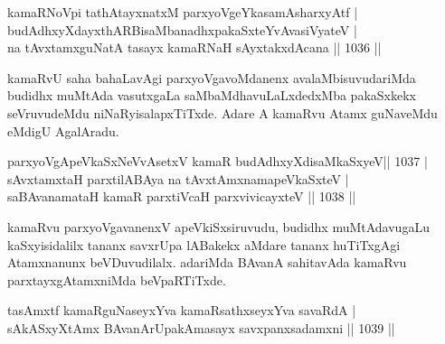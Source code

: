 
\begin{shl}
\footnotemark[3]kamaRNoV\s pi tathA\s tayxnatxM \footnotemark[4]parxyoVgeYkasamAsharxyAtf | \\
budAdhxyXdayxthARBisaMbanadhxpakaSxteYvAvasiVyateV | \\
na tAvxtamxguNatA tasayx kamaRNaH sAyxtakxdAcana \hfill||  1036 ||  
\end{shl}

\begin{artha}
kamaRvU saha bahaLavAgi parxyoVgavoMdanenx avalaMbisuvudariMda budidhx muMtAda vasutxgaLa saMbaMdhavuLaLxdedxMba pakaSxkekx seVruvudeMdu niNaRyisalapxTiTxde. Adare A kamaRvu Atamx guNaveMdu eMdigU AgalAradu.
\end{artha}

\begin{shl}
parxyoVgApeVkaSxNeVvA\s \s setxV kamaR budAdhxyXdisaMkaSxyeV\hfill ||  1037 | \\
sAvxtamxtaH parxtilABAya na tAvxtAmxnamapeVkaSxteV | \\
saBAvanamataH kamaR parxtiVcaH parxvivicayxteV \hfill||  1038 ||  
\end{shl}

\begin{artha}
kamaRvu parxyoVgavanenxV apeVkiSxsiruvudu, budidhx muMtAdavugaLu kaSxyisidalilx tananx savxrUpa lABakekx aMdare tananx huTiTxgAgi Atamxnanunx beVDuvudilalx. adariMda BAvanA sahitavAda kamaRvu parxtayxgAtamxniMda beVpaRTiTxde.
\end{artha}

\begin{shl}
tasAmxtf \footnotemark[2]kamaRguNaseyxYva \footnotemark[3]kamaRsathxseyxYva savaRdA | \\
sAkASxyXtAmx BAvanArUpakAmasayx savxpanxsadamxni \hfill||  1039 ||  
\end{shl}

